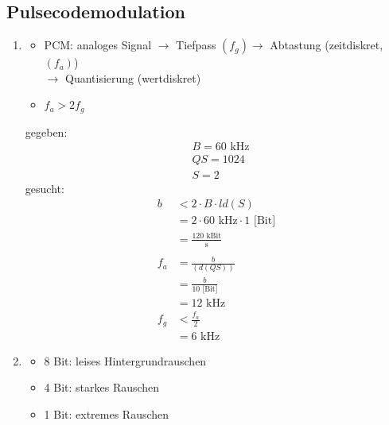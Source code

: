 \subsection{Pulsecodemodulation}
\begin{enumerate}
	\item
	\begin{itemize}
		\item PCM: analoges Signal \(\to\) Tiefpass \((f_{g}) \to \) Abtastung (zeitdiskret, \((f_{a})\)) \\ \(\to\) Quantisierung (wertdiskret)
		\item \(f_{a} > 2 f_{g}\)
	\end{itemize}
	gegeben: 
	\begin{align*}
		&B = 60 \text{ kHz} \\
		&QS = 1024 \\
		&S = 2
	\end{align*}
	gesucht:
	\begin{align*}
		b &< 2\cdot B \cdot ld(S) \\
		&= 2 \cdot 60\text{ kHz} \cdot 1\text{ [Bit]} \\
		&= \frac{120\text{ kBit}}{\text{s}}\\ \\
		f_{a} &= \frac{b}{(d(QS))}	\\
		&= \frac{b}{10\text{ [Bit]}} \\
		&= 12 \text{ kHz} \\
		f_{g} &< \frac{f_{a}}{2} \\
		&= 6 \text{ kHz}
	\end{align*}
	
	\item
	\begin{itemize}
		\item 8 Bit: leises Hintergrundrauschen
		\item 4 Bit: starkes Rauschen
		\item 1 Bit: extremes Rauschen
	\end{itemize}
\end{enumerate}

